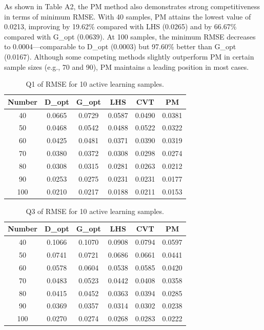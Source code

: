 \documentclass[]{interact}
\theoremstyle{plain}%
\theoremstyle{definition}
\theoremstyle{remark}
\begin{document}
As shown in Table A2, the PM method also demonstrates strong competitiveness in terms of minimum RMSE. With 40 samples, PM attains the lowest value of 0.0213, improving by 19.62\% compared with LHS (0.0265) and by 66.67\% compared with G\_opt (0.0639). At 100 samples, the minimum RMSE decreases to 0.0004—comparable to D\_opt (0.0003) but 97.60\% better than G\_opt (0.0167). Although some competing methods slightly outperform PM in certain sample sizes (e.g., 70 and 90), PM maintains a leading position in most cases.

\begin{table}[h!]
	\centering
	\caption{Q1 of RMSE for 10 active learning samples.}
	\begin{tabular}{cccccc}
		\toprule
		Number & D\_opt & G\_opt & LHS & CVT & PM \\
		\midrule
		40 & 0.0665 & 0.0729 & 0.0587 & 0.0490 & 0.0381 \\
		50 & 0.0468 & 0.0542 & 0.0488 & 0.0522 & 0.0322 \\
		60 & 0.0425 & 0.0481 & 0.0371 & 0.0390 & 0.0319 \\
		70 & 0.0380 & 0.0372 & 0.0308 & 0.0298 & 0.0274 \\
		80 & 0.0308 & 0.0315 & 0.0281 & 0.0263 & 0.0212 \\
		90 & 0.0253 & 0.0275 & 0.0231 & 0.0231 & 0.0177 \\
		100 & 0.0210 & 0.0217 & 0.0188 & 0.0211 & 0.0153 \\
		\bottomrule
	\end{tabular}
\end{table}


\begin{table}[h!]
	\centering
	\caption{Q3 of RMSE for 10 active learning samples.}
	\begin{tabular}{cccccc}
		\toprule
		Number & D\_opt & G\_opt & LHS & CVT & PM \\
		\midrule
		40 & 0.1066 & 0.1070 & 0.0908 & 0.0794 & 0.0597 \\
		50 & 0.0741 & 0.0721 & 0.0686 & 0.0661 & 0.0441 \\
		60 & 0.0578 & 0.0604 & 0.0538 & 0.0585 & 0.0420 \\
		70 & 0.0483 & 0.0523 & 0.0442 & 0.0408 & 0.0358 \\
		80 & 0.0415 & 0.0452 & 0.0363 & 0.0394 & 0.0285 \\
		90 & 0.0369 & 0.0357 & 0.0314 & 0.0302 & 0.0238 \\
		100 & 0.0270 & 0.0274 & 0.0268 & 0.0283 & 0.0222 \\
		\bottomrule
	\end{tabular}
\end{table}
\end{document}
